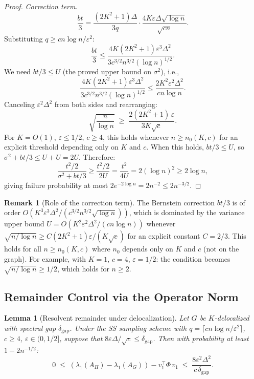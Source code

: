 \documentclass[11pt]{article}
\newtheorem{lemma}[theorem]{Lemma}
\theoremstyle{definition}
\newtheorem{remark}[theorem]{Remark}
\newcommand{\eps}{\varepsilon}
\newcommand{\lamH}{\lambda_1(A_H)}
\newcommand{\lamG}{\lambda_1(A_G)}
\newcommand{\vone}{v_1}
\begin{document}
\begin{proof}
\medskip\noindent\emph{Correction term.}
\[
\frac{bt}{3}
= \frac{(2K^2+1)\Delta}{3q} \cdot \frac{4K\eps\Delta\sqrt{\log n}}{\sqrt{cn}}.
\]
Substituting $q \geq cn\log n/\eps^2$:
\[
\frac{bt}{3}
\leq \frac{4K(2K^2+1)\eps^3\Delta^2}{3c^{3/2}n^{3/2}(\log n)^{1/2}}.
\]
We need $bt/3 \leq U$ (the proved upper bound on $\sigma^2$), i.e.,
\[
\frac{4K(2K^2+1)\eps^3\Delta^2}{3c^{3/2}n^{3/2}(\log n)^{1/2}}
\leq \frac{2K^2\eps^2\Delta^2}{cn\log n}.
\]
Canceling $\eps^2\Delta^2$ from both sides and rearranging:
\[
\sqrt{\frac{n}{\log n}}
\;\geq\; \frac{2(2K^2+1)\,\eps}{3K\sqrt{c}}.
\]
For $K = O(1)$, $\eps \leq 1/2$, $c \geq 4$, this holds whenever
$n \geq n_0(K, c)$ for an explicit threshold depending only on $K$ and $c$.
When this holds, $bt/3 \leq U$, so $\sigma^2 + bt/3 \leq U + U = 2U$.
Therefore:
\[
\frac{t^2/2}{\sigma^2 + bt/3}
\geq \frac{t^2/2}{2U}
= \frac{t^2}{4U}
= 2(\log n)^2
\geq 2\log n,
\]
giving failure probability at most $2e^{-2\log n} = 2n^{-2} \leq 2n^{-3/2}$.
\end{proof}

\begin{remark}[Role of the correction term]\label{rem:correction}
The Bernstein correction $bt/3$ is of order
$O(K^3\eps^3\Delta^2/(c^{3/2}n^{3/2}\sqrt{\log n}))$,
which is dominated by the variance upper bound $U = O(K^2\eps^2\Delta^2/(cn\log n))$
whenever $\sqrt{n/\log n} \geq C(2K^2+1)\eps/(K\sqrt{c})$
for an explicit constant $C = 2/3$. This holds for all $n \geq n_0(K, c)$
where $n_0$ depends only on $K$ and $c$ (not on the graph).
For example, with $K = 1$, $c = 4$, $\eps = 1/2$: the condition becomes
$\sqrt{n/\log n} \geq 1/2$, which holds for $n \geq 2$.
\end{remark}

\subsection{Remainder Control via the Operator Norm}

\begin{lemma}[Resolvent remainder under delocalization]\label{lem:remainder}
Let $G$ be $K$-delocalized with spectral gap $\delta_{\mathrm{gap}}$. Under the SS
sampling scheme with $q = \lceil cn\log n/\eps^2 \rceil$, $c \geq 4$,
$\eps \in (0, 1/2]$, suppose that $8\eps\Delta/\sqrt{c} \leq \delta_{\mathrm{gap}}$.
Then with probability at least $1 - 2n^{-1/2}$:
\[
0 \;\leq\; (\lamH - \lamG) - \vone^\top \Phi\,\vone
\;\leq\; \frac{8\eps^2\Delta^2}{c\,\delta_{\mathrm{gap}}}.
\]
\end{lemma}
\end{document}
